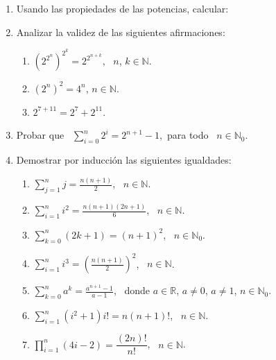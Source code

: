 \documentclass[a4paper,12pt,twoside,spanish,reqno]{amsbook}
\numberwithin{equation}{section}
\newcommand \N{{\mathbb N}}
\begin{document}
\begin{enumerate}
\item Usando las propiedades de las potencias, calcular:



\item Analizar la validez de las siguientes afirmaciones:
 \begin{enumerate}
\item  $\left(2^{2^n}\right)^{2^k} = 2^{2^{n+k}}$,  \ $n$, $k \in {\mathbb N}$.
\item $(2^n)^2 = 4^n$, $n \in {\mathbb N}$.
\item $2^{7+11} = 2^7 + 2^{11}$.
\end{enumerate}

\item Probar que \,  $\sum_{i=0}^n 2^i = 2^{n+1} -1$,\ para todo \ $n \in \N_0$. 

\item Demostrar por inducción  las siguientes igualdades:
  \begin{enumerate}
  \item  $\displaystyle{ \sum_{j=1}^n j = \frac{n(n+1)}{2}}$, \ $n\in \mathbb N$.
  \item  $\displaystyle{ \sum_{i=1}^n i^2 = \frac{n(n+1)(2n+1)}{6}}$, \  $n\in \mathbb N$.
  \item  $\displaystyle{ \sum_{k=0}^n (2k+1) = (n+1)^2}$, \ $n\in \mathbb N_0$.
  \item  $\displaystyle{ \sum_{i=1}^n i^3 = \left( \frac{n(n+1)}{2 }\right)^2}$, \ $n\in \mathbb N$.
  \item  $\displaystyle{ \sum_{k=0}^n a^k = \frac{a^{n+1}-1}{a-1}}$, \  donde $a\in {\mathbb R}$, $a \neq 0$, $a \neq 1$, $n\in \mathbb N_0$.
  \item  $\displaystyle{ \sum_{i=1}^n (i^2+1) i! = n (n+1)!}$, \ $n\in \N$.
  \item  $\displaystyle{ \prod_{i=1}^n (4i - 2) = \dfrac{(2n)!}{n!}}$, \ $n\in \N$.
  \end{enumerate}


\end{enumerate}
\end{document}
